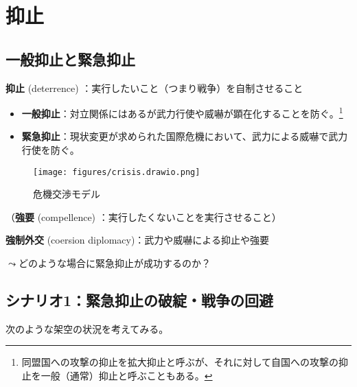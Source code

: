 \documentclass[
  xelatex,
  ja=standard]{bxjsarticle}
\providecommand{\tightlist}{%
  \setlength{\itemsep}{0pt}\setlength{\parskip}{0pt}}\usepackage{longtable,booktabs,array}
\begin{document}
\hypertarget{ux6291ux6b62}{%
\section{抑止}\label{ux6291ux6b62}}

\hypertarget{ux4e00ux822cux6291ux6b62ux3068ux7dcaux6025ux6291ux6b62}{%
\subsection{一般抑止と緊急抑止}\label{ux4e00ux822cux6291ux6b62ux3068ux7dcaux6025ux6291ux6b62}}

\textbf{抑止} (deterrence)
：実行したいこと（つまり戦争）を自制させること

\begin{itemize}
\tightlist
\item
  \textbf{一般抑止}：対立関係にはあるが武力行使や威嚇が顕在化することを防ぐ。\footnote{同盟国への攻撃の抑止を拡大抑止と呼ぶが、それに対して自国への攻撃の抑止を一般（通常）抑止と呼ぶこともある。}
\item
  \textbf{緊急抑止}：現状変更が求められた国際危機において、武力による威嚇で武力行使を防ぐ。
\end{itemize}

\begin{figure}[htpb]

{\centering \texttt{[image: figures/crisis.drawio.png]}

}

\caption{危機交渉モデル}

\end{figure}

（\textbf{強要} (compellence) ：実行したくないことを実行させること）

\textbf{強制外交} (coersion diplomacy)：武力や威嚇による抑止や強要

\(\leadsto\)どのような場合に緊急抑止が成功するのか？

\hypertarget{ux30b7ux30caux30eaux30aa1ux7dcaux6025ux6291ux6b62ux306eux7834ux7dbbux6226ux4e89ux306eux56deux907f}{%
\subsection{シナリオ1：緊急抑止の破綻・戦争の回避}\label{ux30b7ux30caux30eaux30aa1ux7dcaux6025ux6291ux6b62ux306eux7834ux7dbbux6226ux4e89ux306eux56deux907f}}

次のような架空の状況を考えてみる。
\end{document}
